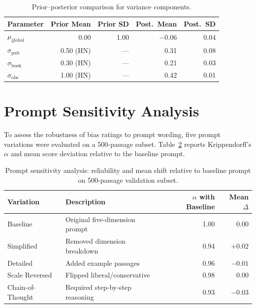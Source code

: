 \documentclass[10pt,letterpaper]{article}
\begin{document}
\begin{table}[h]
\centering
\caption{Prior--posterior comparison for variance components.}
\label{tab:prior_posterior}
\begin{tabular}{lrrrr}
\toprule
\textbf{Parameter} & \textbf{Prior Mean} & \textbf{Prior SD} & \textbf{Post.\ Mean} & \textbf{Post.\ SD} \\
\midrule
$\mu_{\text{global}}$ & 0.00 & 1.00 & $-0.06$ & 0.04 \\
$\sigma_{\text{pub}}$ & 0.50 (HN) & --- & 0.31 & 0.08 \\
$\sigma_{\text{book}}$ & 0.30 (HN) & --- & 0.21 & 0.03 \\
$\sigma_{\text{obs}}$ & 1.00 (HN) & --- & 0.42 & 0.01 \\
\bottomrule
\end{tabular}
\end{table}

\section{Prompt Sensitivity Analysis}
\label{app:prompt_sensitivity}

To assess the robustness of bias ratings to prompt wording, five prompt
variations were evaluated on a 500-passage subset.  Table~\ref{tab:prompt_sens}
reports Krippendorff's $\alpha$ and mean score deviation relative to the
baseline prompt.

\begin{table}[h]
\centering
\caption{Prompt sensitivity analysis: reliability and mean shift relative
to baseline prompt on 500-passage validation subset.}
\label{tab:prompt_sens}
\begin{tabular}{llrr}
\toprule
\textbf{Variation} & \textbf{Description} & \textbf{$\alpha$ with Baseline} & \textbf{Mean $\Delta$} \\
\midrule
Baseline       & Original five-dimension prompt    & 1.00 & 0.00 \\
Simplified     & Removed dimension breakdown       & 0.94 & $+0.02$ \\
Detailed       & Added example passages            & 0.96 & $-0.01$ \\
Scale Reversed & Flipped liberal/conservative      & 0.98 & $\phantom{+}0.00$ \\
Chain-of-Thought & Required step-by-step reasoning & 0.93 & $-0.03$ \\
\bottomrule
\end{tabular}
\end{table}
\end{document}
